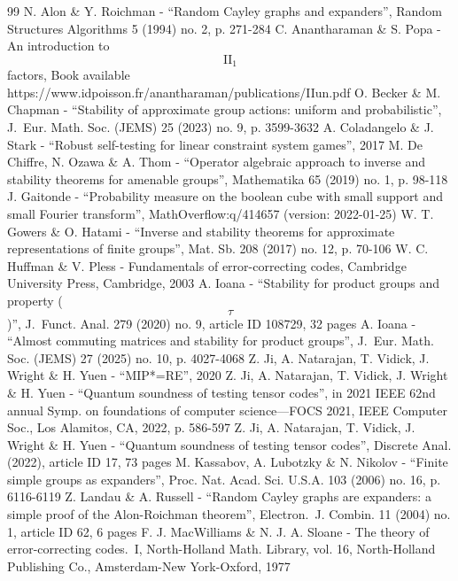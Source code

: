 \begin{thebibliography}{99}
 N. Alon \& Y. Roichman - “Random Cayley graphs and expanders”, Random Structures Algorithms 5 (1994) no. 2, p. 271-284
 C. Anantharaman \& S. Popa - An introduction to $$\mathrm{II}_1$$ factors, Book available https://www.idpoisson.fr/anantharaman/publications/IIun.pdf
 O. Becker \& M. Chapman - “Stability of approximate group actions: uniform and probabilistic”, J. Eur. Math. Soc. (JEMS) 25 (2023) no. 9, p. 3599-3632
 A. Coladangelo \& J. Stark - “Robust self-testing for linear constraint system games”, 2017
 M. De Chiffre, N. Ozawa \& A. Thom - “Operator algebraic approach to inverse and stability theorems for amenable groups”, Mathematika 65 (2019) no. 1, p. 98-118
 J. Gaitonde - “Probability measure on the boolean cube with small support and small Fourier transform”, MathOverflow:q/414657 (version: 2022-01-25)
 W. T. Gowers \& O. Hatami - “Inverse and stability theorems for approximate representations of finite groups”, Mat. Sb. 208 (2017) no. 12, p. 70-106
 W. C. Huffman \& V. Pless - Fundamentals of error-correcting codes, Cambridge University Press, Cambridge, 2003
 A. Ioana - “Stability for product groups and property ($$\tau $$)”, J. Funct. Anal. 279 (2020) no. 9, article ID 108729, 32 pages
 A. Ioana - “Almost commuting matrices and stability for product groups”, J. Eur. Math. Soc. (JEMS) 27 (2025) no. 10, p. 4027-4068
 Z. Ji, A. Natarajan, T. Vidick, J. Wright \& H. Yuen - “MIP*=RE”, 2020
 Z. Ji, A. Natarajan, T. Vidick, J. Wright \& H. Yuen - “Quantum soundness of testing tensor codes”, in 2021 IEEE 62nd annual Symp. on foundations of computer science—FOCS 2021, IEEE Computer Soc., Los Alamitos, CA, 2022, p. 586-597
 Z. Ji, A. Natarajan, T. Vidick, J. Wright \& H. Yuen - “Quantum soundness of testing tensor codes”, Discrete Anal. (2022), article ID 17, 73 pages
 M. Kassabov, A. Lubotzky \& N. Nikolov - “Finite simple groups as expanders”, Proc. Nat. Acad. Sci. U.S.A. 103 (2006) no. 16, p. 6116-6119
 Z. Landau \& A. Russell - “Random Cayley graphs are expanders: a simple proof of the Alon-Roichman theorem”, Electron. J. Combin. 11 (2004) no. 1, article ID 62, 6 pages
 F. J. MacWilliams \& N. J. A. Sloane - The theory of error-correcting codes. I, North-Holland Math. Library, vol. 16, North-Holland Publishing Co., Amsterdam-New York-Oxford, 1977

\end{thebibliography}
